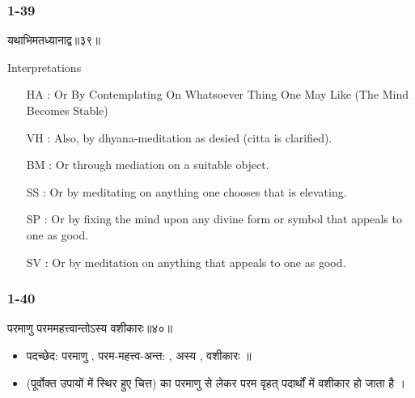 \begin{frame}[fragile]\frametitle{1-39}
\begin{sanskrit}
यथाभिमतध्यानाद्व॥३९॥
\end{sanskrit}

Interpretations
\begin{itemize}	
\item [HA]: Or By Contemplating On Whatsoever Thing One May Like (The Mind Becomes Stable)
\item [VH]: Also, by dhyana-meditation as desied (citta is clarified).
\item [BM]: Or through mediation on a suitable object.
\item [SS]: Or by meditating on anything one chooses that is elevating.
\item [SP]: Or by fixing the mind upon any divine form or symbol that appeals to one as good.
\item [SV]: Or by meditation on anything that appeals to one as good. 
\end{itemize}
	
\end{frame}


\begin{frame}[fragile]\frametitle{1-40}
\begin{sanskrit}
परमाणु परममहत्त्वान्तोऽस्य वशीकारः॥४०॥
\end{sanskrit}

\begin{itemize}
\item पदच्छेद: परमाणु , परम-महत्त्व-अन्त: , अस्य , वशीकारः ॥
\item (पूर्वोक्त उपायों में स्थिर हुए चित्त) का परमाणु से लेकर परम वृहत् पदार्थों में वशीकार हो जाता है ।
\end{itemize}
	
\end{frame}

